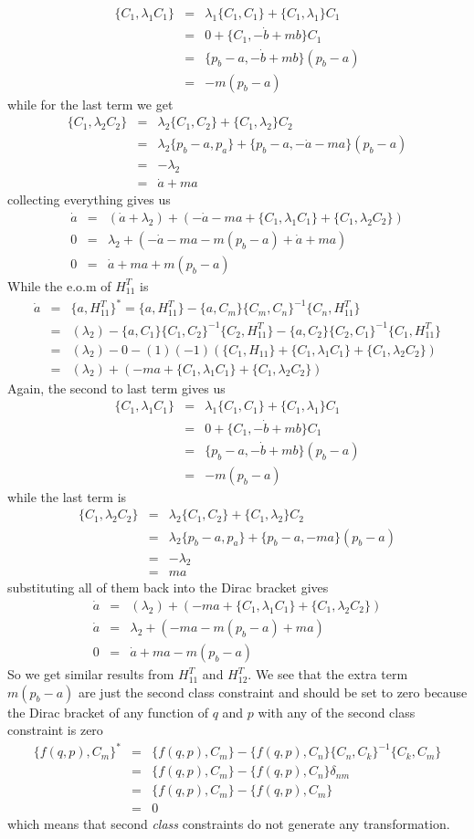 \documentclass[aps,preprint,preprintnumbers,nofootinbib,showpacs,prd]{revtex4-1}
\newcommand{\nbea}{\begin{eqnarray*}}
\newcommand{\neea}{\end{eqnarray*}}
\begin{document}
%
\nbea
\{C_1, \lambda_1 C_1\} & = & \lambda_1\{C_1, C_1\} + \{C_1, \lambda_1\} C_1 \\
& = & 0 + \{C_1, - \dot b + mb\} C_1 \\
& = & \{p_b - a, - \dot b + mb\} (p_b - a) \\
& = & -m (p_b - a)
\neea
%
while for the last term we get
%
\nbea
\{C_1, \lambda_2 C_2\} & = & \lambda_2\{C_1, C_2\} + \{C_1, \lambda_2\} C_2 \\
& = & \lambda_2\{p_b - a, p_a\}  + \{p_b - a, - \dot a - ma\} (p_b - a) \\
& = & -\lambda_2 \\
& = & \dot a + ma
\neea
%
collecting everything gives us
%
\nbea
\dot a & = & (\dot a + \lambda_2) + (-\dot a -ma + \{C_1, \lambda_1 C_1\} + \{C_1, \lambda_2 C_2\} ) \\
0 & = & \lambda_2 + (-\dot a -ma -m (p_b - a) + \dot a + ma) \\
0 & = & \dot a + ma + m (p_b - a)
\neea
%
While the e.o.m of $H^T_{11}$ is
%
\nbea
\dot a & = & \{a, H^T_{11}\}^* = \{a, H^T_{11}\} - \{a, C_m\}\{C_m, C_n\}^{-1}\{C_n, H^T_{11}\} \\
& = & (\lambda_2) - \{a, C_1\}\{C_1, C_2\}^{-1}\{C_2, H^T_{11}\} - \{a, C_2\}\{C_2, C_1\}^{-1}\{C_1, H^T_{11}\} \\
& = & (\lambda_2) - 0 - (1)(-1) (\{C_1, H_{11}\} + \{C_1, \lambda_1 C_1\} + \{C_1, \lambda_2 C_2\} )\\
& = & (\lambda_2) + (-ma + \{C_1, \lambda_1 C_1\} + \{C_1, \lambda_2 C_2\} )
\neea
%
Again, the second to last term gives us
%
\nbea
\{C_1, \lambda_1 C_1\} & = & \lambda_1\{C_1, C_1\} + \{C_1, \lambda_1\} C_1 \\
& = & 0 + \{C_1, - \dot b + mb\} C_1 \\
& = & \{p_b - a, - \dot b + mb\} (p_b - a) \\
& = & -m (p_b - a)
\neea
%
while the last term is
%
\nbea
\{C_1, \lambda_2 C_2\} & = & \lambda_2\{C_1, C_2\} + \{C_1, \lambda_2\} C_2 \\
& = & \lambda_2\{p_b - a, p_a\}  + \{p_b - a, - ma\} (p_b - a) \\
& = & -\lambda_2 \\
& = & ma
\neea
%
substituting all of them back into the Dirac bracket gives
%
\nbea
\dot a & = & (\lambda_2) + ( -ma + \{C_1, \lambda_1 C_1\} + \{C_1, \lambda_2 C_2\} ) \\
\dot a & = & \lambda_2 + ( -ma -m (p_b - a) + ma) \\
0 & = & \dot a + ma - m (p_b - a)
\neea
%
So we get similar results from $H^T_{11}$ and $H^T_{12}$. We see that the extra term $m(p_b - a)$ are just the second class constraint and should be set to zero because the Dirac bracket of any function of $q$ and $p$ with any of the second class constraint is zero
%
\nbea
\{f(q,p), C_m\}^* & = & \{f(q,p), C_m\} - \{f(q,p), C_n\}\{C_n, C_k\}^{-1}\{C_k, C_m\} \\
& = & \{f(q,p), C_m\} - \{f(q,p), C_n\}\delta_{nm} \\
& = & \{f(q,p), C_m\} - \{f(q,p), C_m\} \\
& = & 0
\neea
%
which means that second {\it class} constraints do not generate any transformation. 
\end{document}
